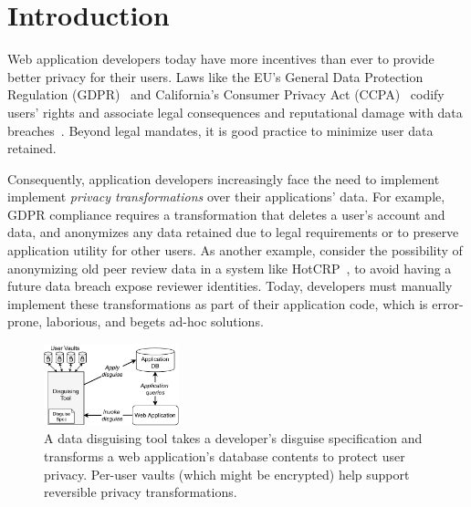 \section{Introduction}
Web application developers today have more incentives than ever to provide better privacy for their
users.
%
Laws like the EU's General Data Protection Regulation (GDPR)~\cite{eu:gdpr} and California's
Consumer Privacy Act (CCPA)~\cite{ca:privacy-act} codify users' rights and associate legal
consequences and reputational damage with data breaches~\cite{breach:amazon,
breach:twitter, breach:fb, breach:marriott, breach:quora}.
%
Beyond legal mandates, it is good practice to minimize user data retained.
%

%
Consequently, application developers increasingly face the need to implement implement
\emph{privacy transformations} over their applications' data.
%
For example, GDPR compliance requires a transformation that deletes a user's account and
data, and anonymizes any data retained due to legal requirements or to preserve
application utility for other users.
%
As another example, consider the possibility of anonymizing old peer review data in a 
system like HotCRP~\cite{hotcrp}, to avoid having a future data breach expose reviewer
identities.
%
Today, developers must manually implement these transformations as part of their application
code, which is error-prone, laborious, and begets ad-hoc solutions.
%

%
%

\begin{figure}[t]
    \centering
    \includegraphics[width=0.35\textwidth]{img/disguise_tool}
    \caption{A data disguising tool takes a developer's disguise specification and transforms
	     a web application's database contents to protect user privacy. Per-user vaults (which
	     might be encrypted) help support reversible privacy transformations.}
    \label{fig:tool}
\end{figure}

